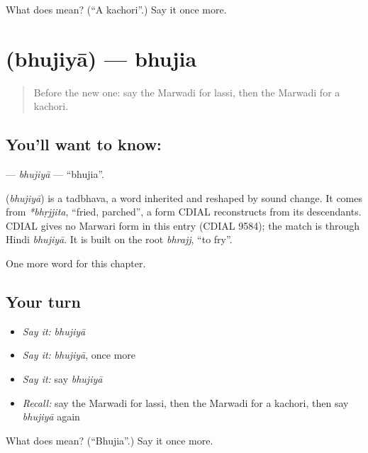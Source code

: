 \begin{tcolorbox}[breakable,colback=teal!4,colframe=teal!35!black,title={Before you move on}]
What does  mean? (\textquotedblleft{}A kachori\textquotedblright{}.) Say it once more.
\end{tcolorbox}
\section[\texorpdfstring{\mw{भुजिया} (bhujiyā)}{भुजिया (bhujiyā)}]{ (bhujiyā) — bhujia}

\label{lesson:MW-C134-bhujiya}



\begin{quote}
Before the new one: say the Marwadi for lassi, then the Marwadi for a kachori.
\end{quote}

\subsection*{You'll want to know: }
\textbf{} — \emph{bhujiyā} — \textquotedblleft{}bhujia\textquotedblright{}.

\begin{cousinweb}
\textbf{} (\emph{bhujiyā}) is a tadbhava, a word inherited and reshaped by sound change. It comes from \emph{*bhṛjjita}, \textquotedblleft{}fried, parched\textquotedblright{}, a form CDIAL reconstructs from its descendants. CDIAL gives no Marwari form in this entry (CDIAL 9584); the match is through Hindi \emph{bhujiyā}. It is built on the root \emph{bhrajj}, \textquotedblleft{}to fry\textquotedblright{}.
\end{cousinweb}

\begin{grammarlens}[title={What you've built}]
One more word for this chapter.
\end{grammarlens}

\subsection*{Your turn}
\begin{itemize}
\raggedright
  \item \emph{Say it:} \emph{bhujiyā}
  \item \emph{Say it:} \emph{bhujiyā}, once more
  \item \emph{Say it:} say \emph{bhujiyā}
  \item \emph{Recall:} say the Marwadi for lassi, then the Marwadi for a kachori, then say \emph{bhujiyā} again
\end{itemize}

\begin{tcolorbox}[breakable,colback=teal!4,colframe=teal!35!black,title={Before you move on}]
What does  mean? (\textquotedblleft{}Bhujia\textquotedblright{}.) Say it once more.
\end{tcolorbox}
